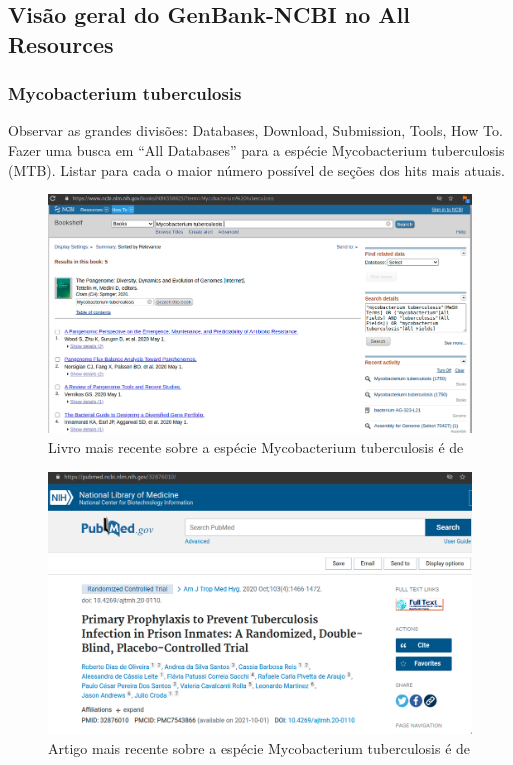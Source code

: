 \subsection{Visão geral do GenBank-NCBI no All Resources}


\subsubsection{Mycobacterium tuberculosis}

Observar as grandes divisões: Databases, Download, Submission,  Tools, How To. Fazer uma busca em “All Databases” para a espécie Mycobacterium tuberculosis (MTB).  
Listar para cada o maior número possível de seções dos hits mais atuais.

    
\begin{figure}[!htp]
    \centering
    \includegraphics[scale=.37]{img/book.png}
    \caption{Livro mais recente sobre a espécie Mycobacterium tuberculosis é de  }
    \label{img:mtb.book}
\end{figure}

    
    
\newpage    
{}

\begin{figure}[!htp]
    \centering
    \includegraphics[scale=.38]{img/article.png}
    \caption{Artigo mais recente sobre a espécie Mycobacterium tuberculosis é de  }
    \label{img:mtb.article}
\end{figure}

